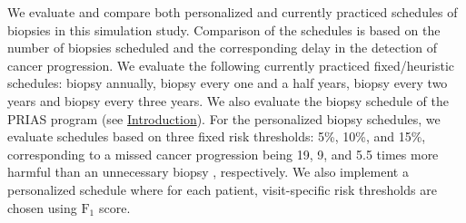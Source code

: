 We evaluate and compare both personalized and currently practiced schedules of biopsies in this simulation study. Comparison of the schedules is based on the number of biopsies scheduled and the corresponding delay in the detection of cancer progression. We evaluate the following currently practiced fixed/heuristic schedules: biopsy annually, biopsy every one and a half years, biopsy every two years and biopsy every three years. We also evaluate the biopsy schedule of the PRIAS program (see \hyperref[sec:introduction]{Introduction}). For the personalized biopsy schedules, we evaluate schedules based on three fixed risk thresholds: 5\%, 10\%, and 15\%, corresponding to a missed cancer progression being 19, 9, and 5.5 times more harmful than an unnecessary biopsy \cite{vickers2006decision}, respectively. We also implement a personalized schedule where for each patient, visit-specific risk thresholds are chosen using $\mbox{F}_1$ score.